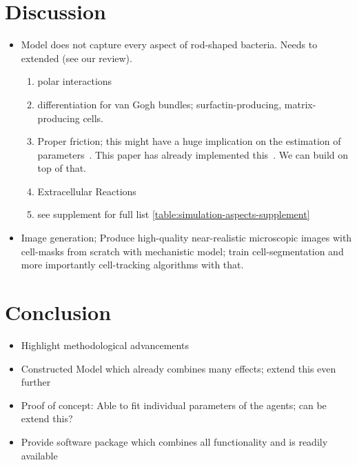 \documentclass{article}
\begin{document}
\section{Discussion}
\label{section:discussion}

\begin{itemize}
    \item Model does not capture every aspect of rod-shaped bacteria. Needs to extended (see our
        review).
    \begin{enumerate}
        \item polar interactions
        \item differentiation for van Gogh bundles; surfactin-producing, matrix-producing cells.
        \item Proper friction; this might have a huge implication on the estimation of
            parameters~\cite{Grant2014}.
            This paper has already implemented this~\cite{Doumic2020}.
            We can build on top of that.
        \item Extracellular Reactions~\cite{Li2025}
        \item see supplement for full list \ref{table:simulation-aspects-supplement}
    \end{enumerate}
    \item Image generation; Produce high-quality near-realistic microscopic images with cell-masks
        from scratch with mechanistic model; train cell-segmentation and more importantly
        cell-tracking algorithms with that.
\end{itemize}

\section{Conclusion}
\label{section:conclusion}

\begin{itemize}
    \item Highlight methodological advancements
    \item Constructed Model which already combines many effects; extend this even further
    \item Proof of concept: Able to fit individual parameters of the agents; can be extend this?
    \item Provide software package which combines all functionality and is readily available
\end{itemize}
\end{document}
